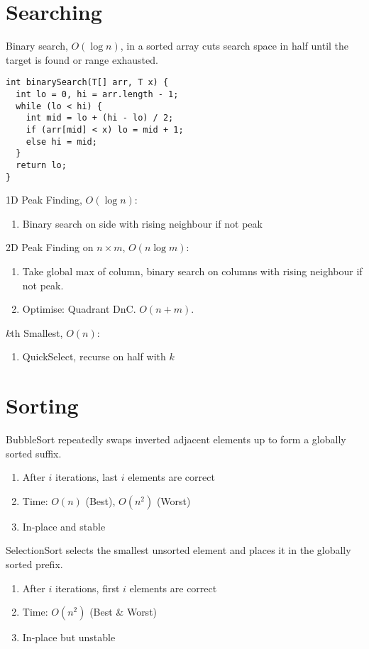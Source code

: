 \documentclass[12pt, a4paper]{article}
\begin{document}
\begin{multicols*}{3}
\section{Searching}
Binary search, $O(\log n)$, in a sorted array cuts search space in half until the target is found or range exhausted.
\begin{lstlisting}
int binarySearch(T[] arr, T x) {
  int lo = 0, hi = arr.length - 1;
  while (lo < hi) {
    int mid = lo + (hi - lo) / 2;
    if (arr[mid] < x) lo = mid + 1;
    else hi = mid;
  }
  return lo;
}
\end{lstlisting}
1D Peak Finding, $O(\log n)$:
\begin{enumerate}[\roman*.]
  \item Binary search on side with rising neighbour if not peak
\end{enumerate}

2D Peak Finding on $n\times m$, $O(n\log m)$:
\begin{enumerate}[\roman*.]
  \item Take global max of column, binary search on columns with rising neighbour if not peak.
  \item Optimise: Quadrant DnC. $O(n+m)$. 
\end{enumerate}

$k$th Smallest, $O(n)$:
\begin{enumerate}[\roman*.]
  \item QuickSelect, recurse on half with $k$
\end{enumerate}

\colbreak
\section{Sorting}
BubbleSort repeatedly swaps inverted adjacent elements up to form a globally sorted suffix. 
\begin{enumerate}[\roman*.]
  \item After $i$ iterations, last $i$ elements are correct
  \item Time: $O(n)$ (Best), $O(n^2)$ (Worst) 
  \item In-place and stable
\end{enumerate}

SelectionSort selects the smallest unsorted element and places it in the globally sorted prefix.
\begin{enumerate}[\roman*.]
  \item After $i$ iterations, first $i$ elements are correct
  \item Time: $O(n^2)$ (Best \& Worst)
  \item In-place but unstable
\end{enumerate}


\end{multicols*}
\end{document}
